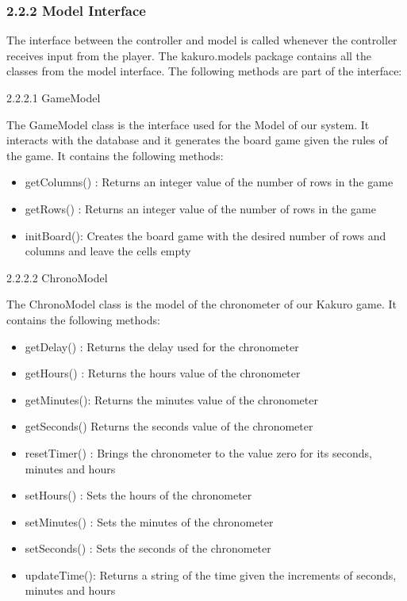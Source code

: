 \documentclass[12pt]{article}
\begin{document}
\subsubsection{2.2.2 Model Interface}
The interface between the controller and model is called whenever the controller receives input from the player. The kakuro.models package contains all the classes from the model interface. The following methods are part of the interface:\newline

2.2.2.1 GameModel \newline

The GameModel class is the interface used for the Model of our system. It interacts with the database and it generates the board game given the rules of the game. It contains the following methods:\newline
\begin{itemize}
\item getColumns() : Returns an integer value of the number of rows in the game
\item getRows() : Returns an integer value of the number of rows in the game
\item initBoard(): Creates the board game with the desired number of rows and columns and leave the cells empty\newline
\end{itemize}

2.2.2.2 ChronoModel\newline

The ChronoModel class is the model of the chronometer of our Kakuro game. It contains the following methods:\newline
\begin{itemize}
\item getDelay() : Returns the delay used for the chronometer
\item getHours() : Returns the hours value of the chronometer
\item getMinutes(): Returns the minutes value of the chronometer
\item getSeconds() Returns the seconds value of the chronometer
\item resetTimer() : Brings the chronometer to the value zero for its seconds, minutes and hours
\item setHours() : Sets the hours of the chronometer
\item setMinutes() : Sets the minutes of the chronometer
\item setSeconds() : Sets the seconds of the chronometer
\item updateTime(): Returns a string of the time given the increments of seconds, minutes and hours\newline
\end{itemize}
\end{document}
